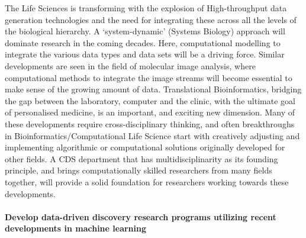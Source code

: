 \documentclass[]{article}
\let\oldparagraph\paragraph
\renewcommand{\paragraph}[1]{\oldparagraph{#1}\mbox{}}
\begin{document}
The Life Sciences is transforming with the explosion of High-throughput
data generation technologies and the need for integrating these across
all the levels of the biological hierarchy. A `system-dynamic' (Systems
Biology) approach will dominate research in the coming decades. Here,
computational modelling to integrate the various data types and data
sets will be a driving force. Similar developments are seen in the field
of molecular image analysis, where computational methods to integrate
the image streams will become essential to make sense of the growing
amount of data. Translational Bioinformatics, bridging the gap between
the laboratory, computer and the clinic, with the ultimate goal of
personalised medicine, is an important, and exciting new dimension. Many
of these developments require cross-disciplinary thinking, and often
breakthroughs in Bioinformatics/Computational Life Science start with
creatively adjusting and implementing algorithmic or computational
solutions originally developed for other fields. A CDS department that
has multidisciplinarity as its founding principle, and brings
computationally skilled researchers from many fields together, will
provide a solid foundation for researchers working towards these
developments.

\hypertarget{develop-data-driven-discovery-research-programs-utilizing-recent-developments-in-machine-learning}{%
\paragraph{Develop data-driven discovery research programs utilizing
recent developments in machine
learning}\label{develop-data-driven-discovery-research-programs-utilizing-recent-developments-in-machine-learning}}
\end{document}
